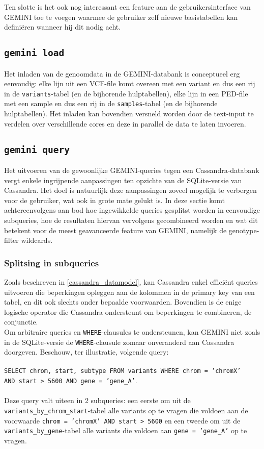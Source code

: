 Ten slotte is het ook nog interessant een feature aan de gebruikersinterface van GEMINI toe te voegen waarmee de gebruiker zelf nieuwe basistabellen kan defini\"eren wanneer hij dit nodig acht.

\subsection{\texttt{gemini load}}

Het inladen van de genoomdata in de GEMINI-databank is conceptueel erg eenvoudig: elke lijn uit een VCF-file komt overeen met een variant en dus een rij in de \texttt{variants}-tabel (en de bijhorende hulptabellen), elke lijn in een PED-file met een sample en dus een rij in de \texttt{samples}-tabel (en de bijhorende hulptabellen). Het inladen kan bovendien versneld worden door de text-input te verdelen over verschillende cores en deze in parallel de data te laten invoeren.

\subsection{\texttt{gemini query}}
\label{gemini_query_concept}
Het uitvoeren van de gewoonlijke GEMINI-queries tegen een Cassandra-databank vergt enkele ingrijpende aanpassingen ten opzichte van de SQLite-versie van Cassandra. Het doel is natuurlijk deze aanpassingen zoveel mogelijk te verbergen voor de gebruiker, wat ook in grote mate gelukt is. In deze sectie komt achtereenvolgens aan bod hoe ingewikkelde queries gesplitst worden in eenvoudige subqueries, hoe de resultaten hiervan vervolgens gecombineerd worden en wat dit betekent voor de meest geavanceerde feature van GEMINI, namelijk de genotype-filter wildcards.

\subsubsection{Splitsing in subqueries}

Zoals beschreven in \ref{cassandra_datamodel}, kan Cassandra enkel effici\"ent queries uitvoeren die beperkingen opleggen aan de kolommen in de primary key van een tabel, en dit ook slechts onder bepaalde voorwaarden. Bovendien is de enige logische operator die Cassandra ondersteunt om beperkingen te combineren, de conjunctie.\\
Om arbitraire queries en \texttt{WHERE}-clausules te ondersteunen, kan GEMINI niet zoals in de SQLite-versie de \texttt{WHERE}-clausule zomaar onveranderd aan Cassandra doorgeven. Beschouw, ter illustratie, volgende query:\\\\
\texttt{SELECT chrom, start, subtype FROM variants WHERE chrom = 'chromX' \\AND start > 5600 AND gene = 'gene\_A'}.\\\\
Deze query valt uiteen in 2 subqueries: een eerste om uit de \texttt{variants\_by\_chrom\_start}-tabel alle variants op te vragen die voldoen aan de voorwaarde \texttt{chrom = 'chromX' AND start > 5600} en een tweede om uit de \texttt{variants\_by\_gene}-tabel alle variants die voldoen aan \texttt{gene = 'gene\_A'} op te vragen.\\

